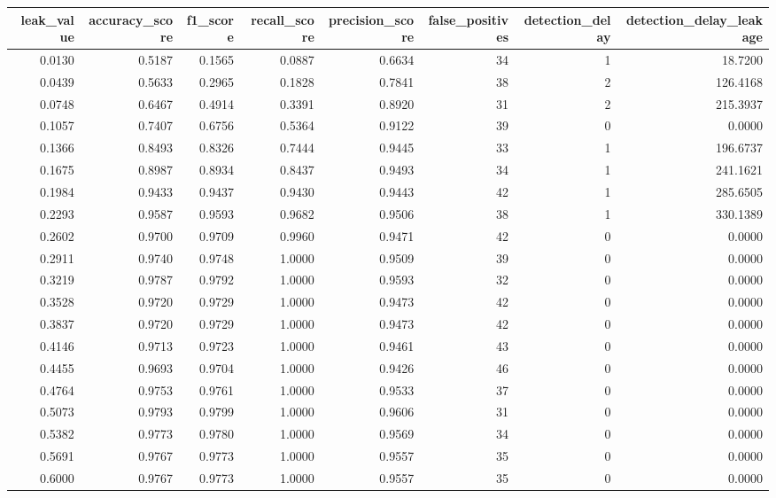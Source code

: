 \begin{tabular}{rrrrrrrr}
\toprule
leak\_value & accuracy\_score & f1\_score & recall\_score & precision\_score & false\_positives & detection\_delay & detection\_delay\_leakage \\
\midrule
0.0130 & 0.5187 & 0.1565 & 0.0887 & 0.6634 & 34 & 1 & 18.7200 \\
0.0439 & 0.5633 & 0.2965 & 0.1828 & 0.7841 & 38 & 2 & 126.4168 \\
0.0748 & 0.6467 & 0.4914 & 0.3391 & 0.8920 & 31 & 2 & 215.3937 \\
0.1057 & 0.7407 & 0.6756 & 0.5364 & 0.9122 & 39 & 0 & 0.0000 \\
0.1366 & 0.8493 & 0.8326 & 0.7444 & 0.9445 & 33 & 1 & 196.6737 \\
0.1675 & 0.8987 & 0.8934 & 0.8437 & 0.9493 & 34 & 1 & 241.1621 \\
0.1984 & 0.9433 & 0.9437 & 0.9430 & 0.9443 & 42 & 1 & 285.6505 \\
0.2293 & 0.9587 & 0.9593 & 0.9682 & 0.9506 & 38 & 1 & 330.1389 \\
0.2602 & 0.9700 & 0.9709 & 0.9960 & 0.9471 & 42 & 0 & 0.0000 \\
0.2911 & 0.9740 & 0.9748 & 1.0000 & 0.9509 & 39 & 0 & 0.0000 \\
0.3219 & 0.9787 & 0.9792 & 1.0000 & 0.9593 & 32 & 0 & 0.0000 \\
0.3528 & 0.9720 & 0.9729 & 1.0000 & 0.9473 & 42 & 0 & 0.0000 \\
0.3837 & 0.9720 & 0.9729 & 1.0000 & 0.9473 & 42 & 0 & 0.0000 \\
0.4146 & 0.9713 & 0.9723 & 1.0000 & 0.9461 & 43 & 0 & 0.0000 \\
0.4455 & 0.9693 & 0.9704 & 1.0000 & 0.9426 & 46 & 0 & 0.0000 \\
0.4764 & 0.9753 & 0.9761 & 1.0000 & 0.9533 & 37 & 0 & 0.0000 \\
0.5073 & 0.9793 & 0.9799 & 1.0000 & 0.9606 & 31 & 0 & 0.0000 \\
0.5382 & 0.9773 & 0.9780 & 1.0000 & 0.9569 & 34 & 0 & 0.0000 \\
0.5691 & 0.9767 & 0.9773 & 1.0000 & 0.9557 & 35 & 0 & 0.0000 \\
0.6000 & 0.9767 & 0.9773 & 1.0000 & 0.9557 & 35 & 0 & 0.0000 \\
\bottomrule
\end{tabular}

